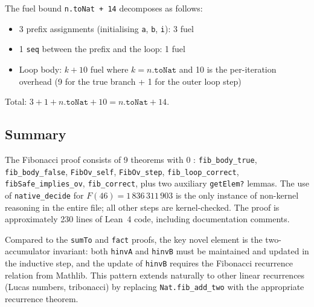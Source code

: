 The fuel bound \texttt{n.toNat + 14} decomposes as follows:
\begin{itemize}[leftmargin=2em]
  \item 3 prefix assignments (initialising \texttt{a}, \texttt{b}, \texttt{i}): 3 fuel
  \item 1 \texttt{seq} between the prefix and the loop: 1 fuel
  \item Loop body: $k + 10$ fuel where $k = n.\texttt{toNat}$ and 10 is the
        per-iteration overhead (9 for the true branch + 1 for the outer loop step)
\end{itemize}

Total: $3 + 1 + n.\texttt{toNat} + 10 = n.\texttt{toNat} + 14$.

\subsection{Summary}

The Fibonacci proof consists of 9 theorems with 0 \sorry:
\texttt{fib\_body\_true}, \texttt{fib\_body\_false}, \texttt{FibOv\_self},
\texttt{FibOv\_step}, \texttt{fib\_loop\_correct},
\texttt{fibSafe\_implies\_ov}, \texttt{fib\_correct}, plus two auxiliary
\texttt{getElem?} lemmas. The use of \texttt{native\_decide} for
$F(46) = 1\,836\,311\,903$ is the only instance of non-kernel reasoning in
the entire file; all other steps are kernel-checked. The proof is approximately
230 lines of Lean~4 code, including documentation comments.

Compared to the \texttt{sumTo} and \texttt{fact} proofs, the key novel
element is the two-accumulator invariant: both \texttt{hinvA} and
\texttt{hinvB} must be maintained and updated in the inductive step, and
the update of \texttt{hinvB} requires the Fibonacci recurrence relation
from Mathlib. This pattern extends naturally to other linear recurrences
(Lucas numbers, tribonacci) by replacing \texttt{Nat.fib\_add\_two} with
the appropriate recurrence theorem.
